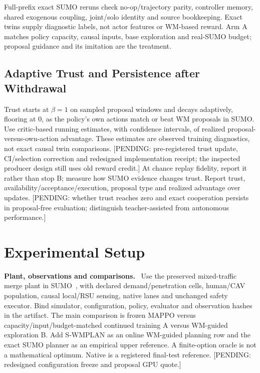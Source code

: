 \documentclass[conference]{IEEEtran}
\newcommand{\pending}[1]{\textcolor{red!80!black}{[PENDING: #1]}}
\newcommand{\para}[1]{\noindent\textbf{#1}\ }
\begin{document}
Full-prefix exact SUMO reruns check no-op/trajectory parity, controller memory,
shared exogenous coupling, joint/solo identity and source bookkeeping.
Exact twins supply diagnostic labels, not actor features or WM-based reward.
Arm A matches policy capacity, causal inputs, base exploration and real-SUMO
budget; proposal guidance and its imitation are the treatment.

\subsection{Adaptive Trust and Persistence after Withdrawal}
Trust starts at $\beta=1$ on sampled proposal windows and decays adaptively,
flooring at $0$, as the policy's own actions match or beat WM proposals in
SUMO. Use critic-based running estimates, with confidence intervals, of
realized proposal-versus-own-action advantage. These estimates are observed
training diagnostics, not exact causal twin comparisons.
\pending{pre-registered trust update, CI/selection correction and redesigned
implementation receipt; the inspected producer design still uses old reward credit.}
At chance replay fidelity, report it rather than stop B; measure how SUMO
evidence changes trust. Report trust, availability/acceptance/execution,
proposal type and realized advantage over updates.
\pending{whether trust reaches zero and exact cooperation persists in
proposal-free evaluation; distinguish teacher-assisted from autonomous performance.}

\section{Experimental Setup}
\para{Plant, observations and comparisons.}
Use the preserved mixed-traffic merge plant in SUMO~\cite{lopez_sumo2018},
with declared demand/penetration cells, human/CAV population, causal local/RSU
sensing, native lanes and unchanged safety executor. Bind simulator,
configuration, policy, evaluator and observation hashes in the artifact.
The main comparison is frozen MAPPO versus capacity/input/budget-matched
continued training A versus WM-guided exploration B. Add S-WMPLAN as an online
WM-guided planning row and the exact SUMO planner as an empirical upper
reference. A finite-option oracle is not a mathematical optimum.
Native is a registered final-test reference.
\pending{redesigned configuration freeze and proposal GPU quote.}
\end{document}
